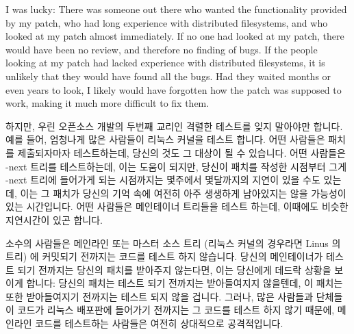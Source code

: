 I was lucky:  There was someone out there who wanted the functionality
provided by my patch, who had long experience with distributed filesystems,
and who looked at my patch almost immediately.
If no one had looked at my patch, there would have been no review, and
therefore no finding of bugs.
If the people looking at my patch had lacked experience with distributed
filesystems, it is unlikely that they would have found all the bugs.
Had they waited months or even years to look, I likely would have forgotten
how the patch was supposed to work, making it much more difficult to
fix them.
\fi

하지만, 우린 오픈소스 개발의 두번째 교리인 격렬한 테스트를 잊지 말아야만
합니다.
예를 들어, 엄청나게 많은 사람들이 리눅스 커널을 테스트 합니다.
어떤 사람들은 패치를 제출되자마자 테스트하는데, 당신의 것도 그 대상이 될 수
있습니다.
어떤 사람들은 -next 트리를 테스트하는데, 이는 도움이 되지만, 당신이 패치를
작성한 시점부터 그게 -next 트리에 들어가게 되는 시점까지는 몇주에서 몇달까지의
지연이 있을 수도 있는데, 이는 그 패치가 당신의 기억 속에 여전히 아주 생생하게
남아있지는 않을 가능성이 있는 시간입니다.
어떤 사람들은 메인테이너 트리들을 테스트 하는데, 이때에도 비슷한 지연시간이
있곤 합니다.

소수의 사람들은 메인라인 또는 마스터 소스 트리 (리눅스 커널의 경우라면 Linus
의 트리) 에 커밋되기 전까지는 코드를 테스트 하지 않습니다.
당신의 메인테이너가 테스트 되기 전까지는 당신의 패치를 받아주지 않는다면, 이는
당신에게 데드락 상황을 보이게 합니다: 당신의 패치는 테스트 되기 전까지는
받아들여지지 않을텐데, 이 패치는 또한 받아들여지기 전까지는 테스트 되지 않을
겁니다.
그러나, 많은 사람들과 단체들이 코드가 리눅스 배포판에 들어가기 전까지는 그
코드를 테스트 하지 않기 때문에, 메인라인 코드를 테스트하는 사람들은 여전히
상대적으로 공격적입니다.

